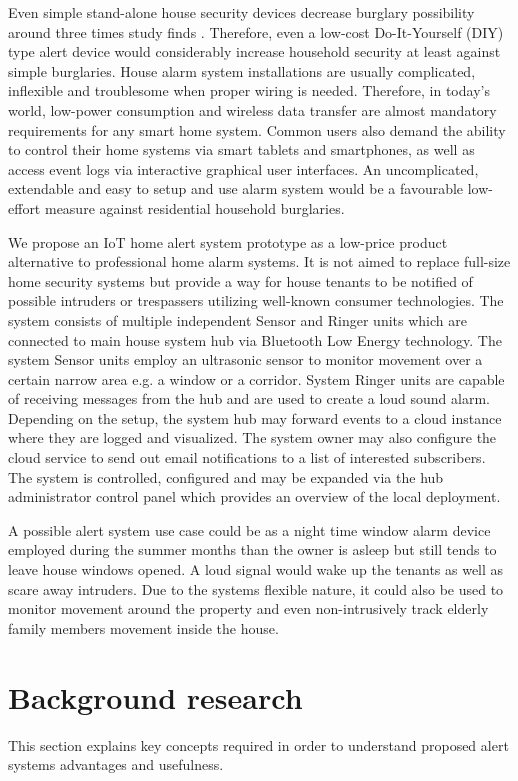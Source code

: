 \documentclass[conference]{IEEEtran}
\begin{document}
Even simple stand-alone house security devices decrease burglary possibility around three times study finds \cite{Tseloni2017}. Therefore, even a low-cost Do-It-Yourself (DIY) type alert device would considerably increase household security at least against simple burglaries. House alarm system installations are usually complicated, inflexible and troublesome when proper wiring is needed. Therefore, in today's world, low-power consumption and wireless data transfer are almost mandatory requirements for any smart home system. Common users also demand the ability to control their home systems via smart tablets and smartphones, as well as access event logs via interactive graphical user interfaces. An uncomplicated, extendable and easy to setup and use alarm system would be a favourable low-effort measure against residential household burglaries.

We propose an IoT home alert system prototype as a low-price product alternative to professional home alarm systems. It is not aimed to replace full-size home security systems but provide a way for house tenants to be notified of possible intruders or trespassers utilizing well-known consumer technologies. The system consists of multiple independent Sensor and Ringer units which are connected to main house system hub via Bluetooth Low Energy technology. The system Sensor units employ an ultrasonic sensor to monitor movement over a certain narrow area e.g. a window or a corridor. System Ringer units are capable of receiving messages from the hub and are used to create a loud sound alarm. Depending on the setup, the system hub may forward events to a cloud instance where they are logged and visualized. The system owner may also configure the cloud service to send out email notifications to a list of interested subscribers. The system is controlled, configured and may be expanded via the hub administrator control panel which provides an overview of the local deployment. 

A possible alert system use case could be as a night time window alarm device employed during the summer months than the owner is asleep but still tends to leave house windows opened. A loud signal would wake up the tenants as well as scare away intruders. Due to the systems flexible nature, it could also be used to monitor movement around the property and even non-intrusively track elderly family members movement inside the house.

\section{Background research}
This section explains key concepts required in order to understand proposed alert systems advantages and usefulness.
\end{document}
